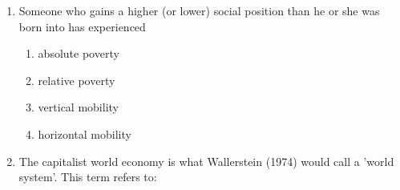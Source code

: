 \documentclass[12pt]{article}
\begin{document}
\begin{enumerate}[label=\arabic*.]
\begin{enumerate}[label=(\alph*)]
    \item children {\csname fa0050Font0\endcsname\char"0072}{\csname fa0050Font1\endcsname\char"0065}{\csname fa0050Font2\endcsname\char"0061} {\csname fa0051Font0\endcsname\char"0064}{\csname fa0051Font1\endcsname\char"0020}{\csname fa0051Font2\endcsname\char"0065} {\csname fa0052Font0\endcsname\char"0064}{\csname fa0052Font1\endcsname\char"0075}{\csname fa0052Font2\endcsname\char"0063}{\csname fa0052Font3\endcsname\char"0061} {\csname fa0053Font0\endcsname\char"0074}{\csname fa0053Font1\endcsname\char"0069}{\csname fa0053Font2\endcsname\char"006F}{\csname fa0053Font3\endcsname\char"006E} {\csname fa0054Font0\endcsname\char"0061}{\csname fa0054Font1\endcsname\char"006C}{\csname fa0054Font2\endcsname\char"0020}{\csname fa0054Font3\endcsname\char"0062} {\csname fa0055Font0\endcsname\char"006F}{\csname fa0055Font1\endcsname\char"006F}{\csname fa0055Font2\endcsname\char"006B}{\char"0073} and then copy the behaviour
    \item audiences {\csname fa0056Font0\endcsname\char"0072}{\csname fa0056Font1\endcsname\char"0065}{\csname fa0056Font2\endcsname\char"0069}{\csname fa0056Font3\endcsname\char"006E}{\csname fa0056Font4\endcsname\char"0066}{\csname fa0056Font5\endcsname\char"006F}{\csname fa0056Font6\endcsname\char"0072}{\csname fa0056Font7\endcsname\char"0063}{\char"0065} the ethnic stereotypes represented by the media
    \item elitists express concern with the {\csname fa0057Font0\endcsname\char"0067}{\csname fa0057Font1\endcsname\char"006C}{\csname fa0057Font2\endcsname\char"006F}{\csname fa0057Font3\endcsname\char"0062}{\char"0061}{\csname fa0057Font5\endcsname\char"006C}{\char"0069}{\char"007A}{\char"0061}{\char"0074}{\char"0069}{\char"006F}{\char"006E} of culture
\end{enumerate}
\item Someone who gains a higher (or lower) social position than he or she was born into has experienced
\begin{enumerate}[label=(\alph*)]
    \item absolute poverty
    \item relative poverty
    \item vertical mobility
    \item horizontal mobility
\end{enumerate}
\item The capitalist world economy is what Wallerstein (1974) would call a 'world system'. This term refers to:
\begin{enumerate}[label=(\alph*)]

\end{enumerate}
\end{enumerate}
\end{document}
